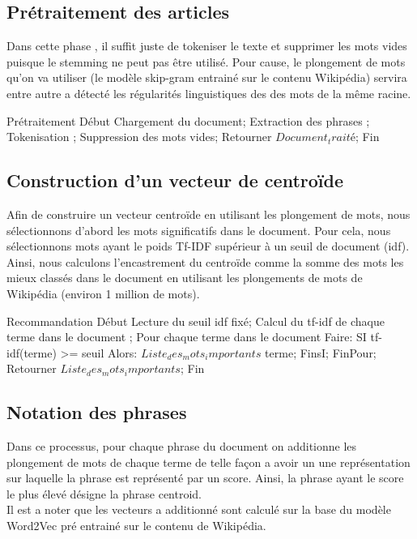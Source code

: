 \subsection{Prétraitement des articles}
Dans cette phase , il suffit juste de tokeniser le texte et supprimer les mots vides puisque le stemming ne peut pas être utilisé. Pour cause, le plongement de mots qu'on va utiliser (le modèle skip-gram entrainé sur le contenu Wikipédia) servira entre autre a détecté les régularités linguistiques des des mots de la même racine.

\begin{algorithm}
	\begin{algorithmic}[1]

\STATE Prétraitement
\STATE Début
\STATE Chargement du document;
\STATE Extraction des phrases ;
\STATE Tokenisation ;
\STATE Suppression des mots vides;
\STATE \quad Retourner $Document_traité$;
\STATE Fin

\end{algorithmic}
\end{algorithm}

\subsection{Construction d'un vecteur de centroïde}
Afin de construire un vecteur centroïde en utilisant les plongement de mots, nous sélectionnons d'abord les mots significatifs dans le document. Pour cela, nous sélectionnons mots ayant le poids Tf-IDF supérieur à un seuil de document (idf). Ainsi, nous calculons l'encastrement du centroïde comme la somme des mots les mieux classés dans le document en utilisant les plongements de mots de Wikipédia (environ 1 million de mots). 

\begin{algorithm}
	\begin{algorithmic}[1]
		\STATE Recommandation
		\STATE Début
		\STATE Lecture du seuil idf fixé;
		\STATE Calcul du tf-idf de chaque terme dans le document ;
		\STATE Pour chaque terme dans le document Faire:
		\STATE SI tf-idf(terme) >= seuil Alors:
		\STATE    $Liste_des_mots_importants$ \gets terme;
		\STATE FinsI;
		\STATE FinPour;
		\STATE \quad Retourner $Liste_des_mots_importants$;
		\STATE Fin
	\end{algorithmic}
\end{algorithm}


\subsection{Notation des phrases}
Dans ce processus, pour chaque phrase du document on additionne les plongement de mots de chaque terme de telle façon a avoir un une représentation sur laquelle la phrase est représenté par un score. Ainsi, la phrase ayant le score le plus élevé désigne la phrase centroid.\\
Il est a noter que les vecteurs a additionné sont calculé sur la base du modèle Word2Vec pré entrainé sur le contenu de Wikipédia.

